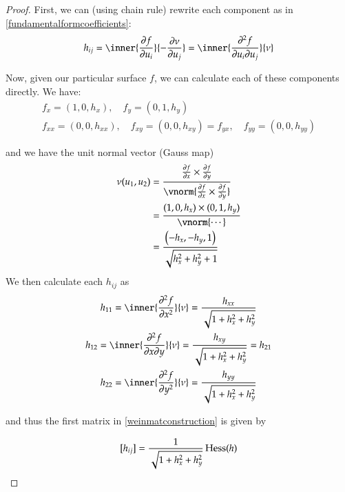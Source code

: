         	\begin{proof}
        		First, we can (using chain rule) rewrite each component as in  \cref{fundamentalformcoefficients}:
        		 \[ h_{ij} = \inner{\frac{\partial f}{\partial u_i}}{-\frac{\partial \nu}{\partial u_j}}
        		= \inner{\frac{\partial^2 f}{\partial u_i \partial u_j}}{\nu} \]
        		
        		Now, given our particular surface $f$, we can calculate each of these components directly. We have:
        		\begin{equation}
        		\begin{gathered}
        		f_{x} = (1, 0, h_x) , \quad
        		f_{y} = (0, 1, h_y)  \\
        		f_{xx} = (0, 0, h_{xx}) , \quad
        		f_{xy} = (0, 0, h_{xy}) = f_{yx} , \quad
        		f_{yy} = (0, 0, h_{yy})
        		\end{gathered}
        		\end{equation}
        		
        		and we have the unit normal vector (Gauss map)
        		\begin{align}
        		\nu(u_1, u_2) &=
        		\frac{\frac{\partial f}{\partial x} \times \frac{\partial f}{\partial y}}
        		{\vnorm{\frac{\partial f}{\partial x} \times \frac{\partial f}{\partial y}}} \\
        		&= \frac{(1, 0, h_x) \times (0, 1, h_y)}{\vnorm{\cdots}} \\
        		&= \frac{\left( -h_x , -h_y , 1 \right)}{\sqrt{h_x^2 + h_y^2 + 1}}
			 \end{align}
			 We then calculate each $h_{ij}$ as
			 \begin{equation}
			 \begin{gathered}
			 h_{11} = \inner{\frac{\partial^2 f}{\partial x^2}}{\nu} = 
				 \frac{h_{xx}}{\sqrt{1+h_x^2 + h_y^2}} \\
				  h_{12} = \inner{\frac{\partial^2 f}{\partial x \partial y}}{\nu} = 
				  \frac{h_{xy}}{\sqrt{1+h_x^2 + h_y^2}} = h_{21} \\
				  h_{22} = \inner{\frac{\partial^2 f}{\partial y^2}}{\nu} = 
				  \frac{h_{yy}}{\sqrt{1+h_x^2 + h_y^2}} \\
			 \end{gathered}
			 \end{equation}
			 
			 and thus the first matrix in \cref{weinmatconstruction} is given by
			 
			 \begin{equation} \label{hij_exactgraph}
			 [h_{ij}] = \frac{1}{\sqrt{1+h_x^2 + h_y^2}} \,  \mathrm{Hess} (h)
			 \end{equation}
			 

\end{proof}
